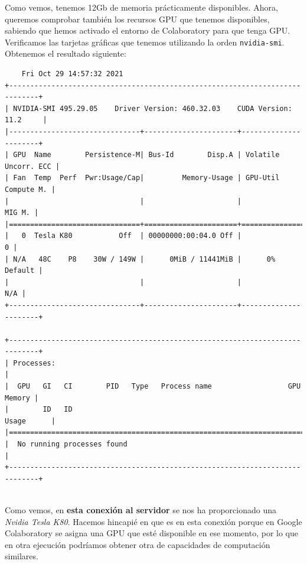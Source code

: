 \documentclass[11pt]{article}
\def\inline{\lstinline[basicstyle=\ttfamily,keywordstyle={}]}
\theoremstyle{plain}
\begin{document}
Como vemos, tenemos 12Gb de memoria prácticamente disponibles. Ahora, queremos comprobar también los recursos GPU que tenemos disponibles, sabiendo que hemos activado el entorno de Colaboratory para que tenga GPU. Verificamos las tarjetas gráficas que tenemos utilizando la orden \inline{nvidia-smi}. Obtenemos el resultado siguiente:\\

\begin{minipage}{0.7\textwidth}

\begin{verbatim}
	Fri Oct 29 14:57:32 2021       
+-----------------------------------------------------------------------------+
| NVIDIA-SMI 495.29.05    Driver Version: 460.32.03    CUDA Version: 11.2     |
|-------------------------------+----------------------+----------------------+
| GPU  Name        Persistence-M| Bus-Id        Disp.A | Volatile Uncorr. ECC |
| Fan  Temp  Perf  Pwr:Usage/Cap|         Memory-Usage | GPU-Util  Compute M. |
|                               |                      |               MIG M. |
|===============================+======================+======================|
|   0  Tesla K80           Off  | 00000000:00:04.0 Off |                    0 |
| N/A   48C    P8    30W / 149W |      0MiB / 11441MiB |      0%      Default |
|                               |                      |                  N/A |
+-------------------------------+----------------------+----------------------+
                                                                               
+-----------------------------------------------------------------------------+
| Processes:                                                                  |
|  GPU   GI   CI        PID   Type   Process name                  GPU Memory |
|        ID   ID                                                   Usage      |
|=============================================================================|
|  No running processes found                                                 |
+-----------------------------------------------------------------------------+
\end{verbatim}
\end{minipage}\\

Como vemos, en \textbf{esta conexión al servidor} se nos ha proporcionado una \emph{Nvidia Tesla K80}. Hacemos hincapié en que es en esta conexión porque en Google Colaboratory se asigna una GPU que esté disponible en ese momento, por lo que en otra ejecución podríamos obtener otra de capacidades de computación similares.
\end{document}
